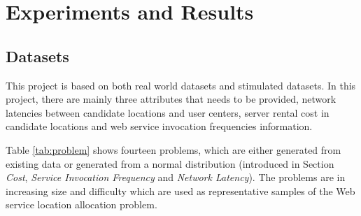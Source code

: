 % 
% 


\section{Experiments and Results}
\subsection{Datasets}
\label{sec:datasets}
This project is based on both real world datasets and stimulated datasets. 
In this project, there are mainly three attributes that needs to be provided, 
network latencies between candidate locations and user centers,  server rental cost in candidate locations 
and web service invocation frequencies information.

Table \ref{tab:problem} shows fourteen problems, 
which are either generated from existing data or generated from a normal distribution (introduced in Section \emph{Cost}, \emph{Service Invocation Frequency} and \emph{Network Latency}).  
The problems are in increasing size and difficulty which are used as representative samples of the Web service 
location allocation problem.

